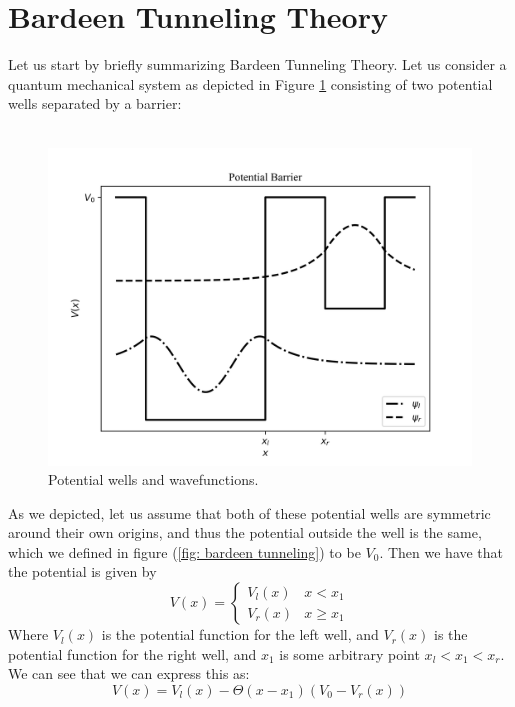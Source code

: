 \documentclass[
  reprint,
  amsmath,amssymb,
  aps
]{revtex4-1}
\begin{document}
\section{\label{sec:level1}Bardeen Tunneling Theory}
Let us start by briefly summarizing Bardeen Tunneling Theory. Let us consider a quantum mechanical system as depicted in 
Figure \ref{fig:bardeen tunneling} consisting of two potential wells separated by a barrier:\\\\
\begin{figure}[H]
    \centering
    \includegraphics[width=0.9\linewidth]{bardeen_tunneling.png}
    \caption{Potential wells and wavefunctions.}
    \label{fig:bardeen tunneling}
\end{figure}
As we depicted, let us assume that both of these potential wells are symmetric around their own origins, and thus 
the potential outside the well is the same, which we defined in figure (\ref{fig: bardeen tunneling}) to be $V_0$. 
Then we have that the potential is given by
\begin{equation}
    V(x) = \begin{cases}
        V_l(x) & x < x_1\\
        V_r(x) & x \geq x_1
    \end{cases}
\end{equation}
Where $V_l(x)$ is the potential function for the left well, and $V_r(x)$ is the potential function for the right well, and 
$x_1$ is some arbitrary point $x_l<x_1<x_r$. We can see that we can express this as: 
\begin{equation}
    V(x) = V_l(x) - \Theta(x-x_1)(V_0-V_r(x))
\end{equation}
\end{document}
